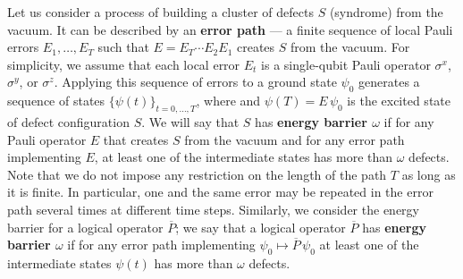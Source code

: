 Let us consider a process of building a cluster of defects $S$ (syndrome) from the vacuum.
It can be described by an {\bf error path} 
--- a finite sequence of local Pauli errors  $E_1,\ldots,E_T$ such that
$E = E_T \cdots E_2 E_1$ creates $S$ from the vacuum.
For simplicity, we assume that each local error  $E_t$ 
is a single-qubit Pauli operator $\sigma^x$, $\sigma^y$, or $\sigma^z$.
Applying this sequence of errors to a ground state $\psi_0$
generates a sequence of states $\{ \psi(t)\}_{t=0,\ldots,T}$,
where and $\psi(T)=E \, \psi_0$ is the excited state of defect configuration $S$.
We will say that $S$ has {\bf energy barrier $\omega$}
if for any Pauli operator $E$ that creates $S$ from the vacuum 
and for any error path implementing $E$,
at least one of the intermediate states has more than $\omega$ defects.
Note that we do not impose any restriction on the length of the path $T$ as long as it is finite.
In particular, one and the same error may be repeated in the error path several times
at different time steps.
Similarly, we consider the energy barrier for a logical operator $\overline{P}$;
we say that a logical operator $\overline{P}$ has {\bf energy barrier $\omega$}
if for any error path implementing $\psi_0 \mapsto \overline P \, \psi_0$
at least one of the intermediate states $\psi(t)$ has more than $\omega$ defects.


